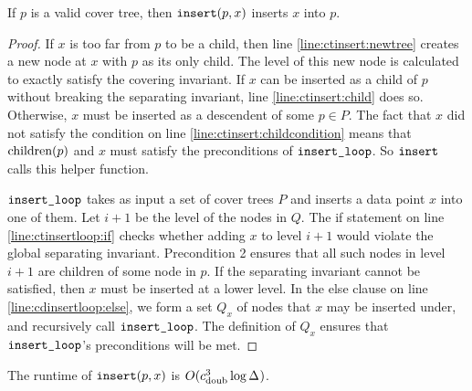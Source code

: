 \documentclass[../main.tex]{subfiles}
\newcommand{\aspect}[1]{\Delta_{#1}}
\newcommand{\cdoub}{c_\textnormal{doub}}
\newcommand{\mkfunction}[1]{\ifmmode{\textnormal{{#1}}}}
\newcommand{\children}[1]   {\mkfunction{children}({#1})}
\newcommand{\ctinsert}{\ensuremath{\textnormal{\ttfamily insert}}}
\newcommand{\ctinsertloop}{\ensuremath{\textnormal{\ttfamily insert\_loop}}}
\begin{document}
\begin{theorem}
    If $p$ is a valid cover tree, then $\ctinsert(p,x)$ inserts $x$ into $p$.
\end{theorem}
\begin{proof}
    If $x$ is too far from $p$ to be a child, 
    then line \ref{line:ctinsert:newtree} creates a new node at $x$ with $p$ as its only child.
    The level of this new node is calculated to exactly satisfy the covering invariant.
    If $x$ can be inserted as a child of $p$ without breaking the separating invariant,
    line \ref{line:ctinsert:child} does so.
    Otherwise, $x$ must be inserted as a descendent of some $p\in P$.
    The fact that $x$ did not satisfy the condition on line \ref{line:ctinsert:childcondition}
    means that $\children{p}$ and $x$ must satisfy the preconditions of $\ctinsertloop$.
    So $\ctinsert$ calls this helper function.

    $\ctinsertloop$ takes as input a set of cover trees $P$ and inserts a data point $x$ into one of them.
    Let $i+1$ be the level of the nodes in $Q$.
    The if statement on line \ref{line:ctinsertloop:if} checks whether adding $x$ to level $i+1$ would violate the global separating invariant.
    Precondition 2 ensures that all such nodes in level $i+1$ are children of some node in $p$.
    If the separating invariant cannot be satisfied, 
    then $x$ must be inserted at a lower level.
    In the else clause on line \ref{line:cdinsertloop:else}, 
    we form a set $Q_x$ of nodes that $x$ may be inserted under,
    and recursively call $\ctinsertloop$.
    The definition of $Q_x$ ensures that $\ctinsertloop$'s preconditions will be met.
\end{proof}

\begin{theorem}
    The runtime of $\ctinsert(p,x)$ is $O(\cdoub^3 \log\aspect{})$.
\end{theorem}
\end{document}
